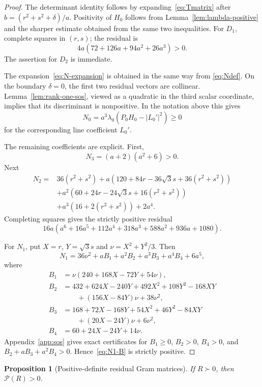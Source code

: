 \documentclass[11pt]{article}
\newtheorem{proposition}[theorem]{Proposition}
\theoremstyle{definition}
\newcommand{\pd}{\succ 0}
\begin{document}
\begin{proof}
The determinant identity follows by expanding~\eqref{eq:Tmatrix} after
$b=(r^2+s^2+\delta)/a$.  Positivity of $H_0$ follows from
Lemma~\ref{lem:lambda-positive} and the sharper estimate obtained from the
same two inequalities.  For $D_1$, complete squares in $(r,s)$; the residual
is
\[
 4a(72+126a+94a^2+26a^3)>0.
\]
The assertion for $D_2$ is immediate.

The expansion~\eqref{eq:N-expansion} is obtained in the same way from
\eqref{eq:Ndef}.  On the boundary $\delta=0$, the first two residual vectors
are collinear.  Lemma~\ref{lem:rank-one-sos}, viewed as a quadratic in the
third scalar coordinate, implies that its discriminant is nonpositive.  In
the notation above this gives
\[
 N_0=a^3\lambda_0(P_0H_0-|L_0'|^2)\geq0
\]
for the corresponding line coefficient $L_0'$.

The remaining coefficients are explicit.  First,
\[
 N_3=(a+2)(a^2+6)>0.
\]
Next
\begin{align*}
 N_2={}&36(r^2+s^2)
 +a(120+84r-36\sqrt3s+36(r^2+s^2))\\
 &+a^2(60+24r-24\sqrt3s+16(r^2+s^2))\\
 &+a^3(16+2(r^2+s^2))+2a^4.
\end{align*}
Completing squares gives the strictly positive residual
\[
 16a(a^6+16a^5+112a^4+318a^3+588a^2+936a+1080).
\]

For $N_1$, put $X=r$, $Y=\sqrt3s$ and
$\nu=X^2+Y^2/3$.  Then
\begin{equation}\label{eq:N1-B}
 N_1=36\nu^2+aB_1+a^2B_2+a^3B_3+a^4B_4+6a^5,
\end{equation}
where
\begin{align*}
 B_1&=\nu(240+168X-72Y+54\nu),\\
 B_2&=432+624X-240Y+492X^2+108Y^2-168XY\\
    &\qquad +(156X-84Y)\nu+38\nu^2,\\
 B_3&=168+72X-168Y+54X^2+46Y^2-84XY\\
    &\qquad +(20X-24Y)\nu+6\nu^2,\\
 B_4&=60+24X-24Y+14\nu.
\end{align*}
Appendix~\ref{app:sos} gives exact certificates for
$B_1\geq0$, $B_2>0$, $B_4>0$, and
$B_2+aB_3+a^2B_4>0$.  Hence~\eqref{eq:N1-B} is strictly positive.
\end{proof}

\begin{proposition}[Positive-definite residual Gram matrices]
If $R\pd$, then $\mathcal P(R)>0$.
\end{proposition}
\end{document}
